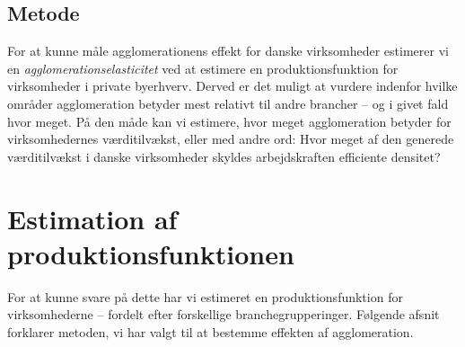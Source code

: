 \subsection{Metode}
\label{sec:Metodeafsnit}
For at kunne måle agglomerationens effekt for danske virksomheder estimerer vi en \emph{agglomerationselasticitet} ved at estimere en produktionsfunktion for virksomheder i private byerhverv. Derved er det muligt at vurdere indenfor hvilke områder agglomeration betyder mest relativt til andre brancher -- og i givet fald hvor meget. På den måde kan vi estimere, hvor meget agglomeration betyder for virksomhedernes værditilvækst, eller med andre ord: Hvor meget af den generede værditilvækst i danske virksomheder skyldes arbejdskraften efficiente densitet?
\section{Estimation af produktionsfunktionen}
For at kunne svare på dette har vi estimeret en produktionsfunktion for virksomhederne -- fordelt efter forskellige branchegrupperinger. Følgende afsnit forklarer metoden, vi har valgt til at bestemme effekten af agglomeration.

